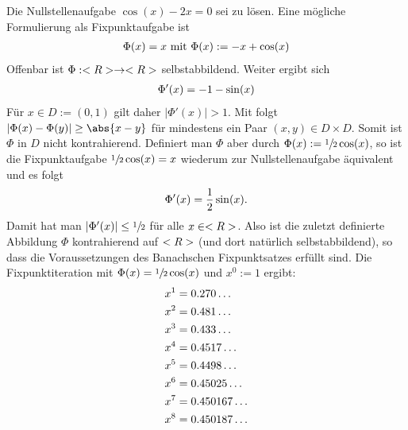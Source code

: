 \begin{example}
	Die Nullstellenaufgabe $\cos(x) - 2x = 0$ sei zu lösen. Eine mögliche Formulierung als Fixpunktaufgabe ist
	\begin{align}
	\Phi(x) = x \text{   mit  } \Phi(x) := -x + \cos(x) \notag
	\end{align}
	Offenbar ist $\Phi: <R> \to <R>$ selbstabbildend. Weiter ergibt sich
	\begin{align}
	\Phi'(x) = -1 - \sin(x) \notag
	\end{align}
	Für $x \in D := (0,1)$ gilt daher $\vert \Phi' (x)\vert > 1$. Mit  folgt $\vert \Phi(x) - \Phi(y)\vert \ge \abs{x-y}$ für mindestens ein Paar $(x,y) \in D \times D$. Somit ist $\Phi$ in $D$ nicht kontrahierend.
	Definiert man $\Phi$ aber durch $\Phi(x) := \sfrac{1}{2}\cos(x)$, so ist die Fixpunktaufgabe $\sfrac{1}{2}\cos(x) = x$ wiederum zur Nullstellenaufgabe äquivalent und es folgt
	\begin{align}
	\Phi'(x) = \frac{1}{2}\sin(x). \notag
	\end{align} 
	Damit hat man $\vert \Phi'(x)\vert \le \sfrac{1}{2}$ für alle $x \in <R>$. Also ist die zuletzt definierte Abbildung $\Phi$ kontrahierend auf $<R>$ (und dort natürlich selbstabbildend), so dass die Voraussetzungen des Banachschen Fixpunktsatzes erfüllt sind. Die Fixpunktiteration mit $\Phi(x) = \sfrac{1}{2}\cos(x)$ und $x^0 := 1$ ergibt:
	\begin{align}
		x^1 &= 0.270\dots \notag \\
		x^2 &= 0.481\dots \notag \\
		x^3 &= 0.433\dots \notag \\
		x^4 &= 0.4517\dots \notag \\
		x^5 &= 0.4498 \dots \notag \\
		x^6 &= 0.45025\dots \notag \\
		x^7 &= 0.450167\dots \notag \\
		x^8 &= 0.450187\dots \notag
	\end{align}
	\begin{center}
	\end{center}
\end{example}

